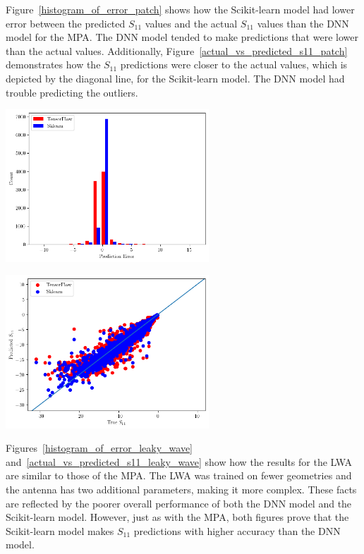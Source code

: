 \documentclass[conference]{IEEEtran}
\newenvironment{Figure}
    {\par\medskip\noindent\minipage{\linewidth}}
    {\endminipage\par\medskip}
\begin{document}
Figure~\ref{histogram_of_error_patch} shows how the Scikit-learn model had lower error between the predicted $S_{11}$ values and the actual $S_{11}$ values than the DNN model for the MPA. The DNN model tended to make predictions that were lower than the actual values. Additionally, Figure~\ref{actual_vs_predicted_s11_patch} demonstrates how the $S_{11}$ predictions were closer to the actual values, which is depicted by the diagonal line, for the Scikit-learn model. The DNN model had trouble predicting the outliers. 

\begin{Figure}
    \centering
    \includegraphics[width=3in]{histogram_patch}
    \label{histogram_of_error_patch}
\end{Figure}

\begin{Figure}
    \centering
    \includegraphics[width=3in]{actual_vs_predicted_s11_patch}
    \label{actual_vs_predicted_s11_patch}
\end{Figure}

Figures~\ref{histogram_of_error_leaky_wave} and~\ref{actual_vs_predicted_s11_leaky_wave} show how the results for the LWA are similar to those of the MPA. The LWA was trained on fewer geometries and the antenna has two additional parameters, making it more complex. These facts are reflected by the poorer overall performance of both the DNN model and the Scikit-learn model. However, just as with the MPA, both figures prove that the Scikit-learn model makes $S_{11}$ predictions with higher accuracy than the DNN model.
\end{document}
